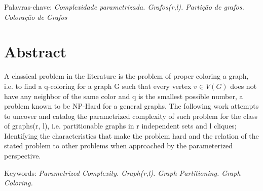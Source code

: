 \documentclass[a4paper,oneside,12pt]{book}
\begin{document}
\bigskip
%

\noindent Palavras-chave: \textit{Complexidade parametrizada. Grafos(r,l). Partição de grafos. Coloração de Grafos}


\chapter*{Abstract}

\thispagestyle{myheadings}
\nocite{*}

A classical problem in the literature is the problem of proper coloring a graph, i.e. to find a q-coloring for a graph G such that every vertex $ v \in V (G) $ does not have any neighbor of the same color and q is the smallest possible number, a problem known to be NP-Hard for a general graphs. The following work attempts to uncover and catalog the parametrized complexity of such problem for the class of graphs(r, l), i.e. partitionable graphs in r independent sets and l cliques; Identifying the characteristics that make the problem hard and the relation of the stated problem to other problems when approached by the parameterized perspective.

\bigskip
%

\noindent Keywords: \textit{Parametrized Complexity. Graph(r,l). Graph Partitioning. Graph Coloring. }


\tableofcontents

\thispagestyle{myheadings}



\listoffigures
{}

\thispagestyle{myheadings}


\listoftables
{}
\end{document}
